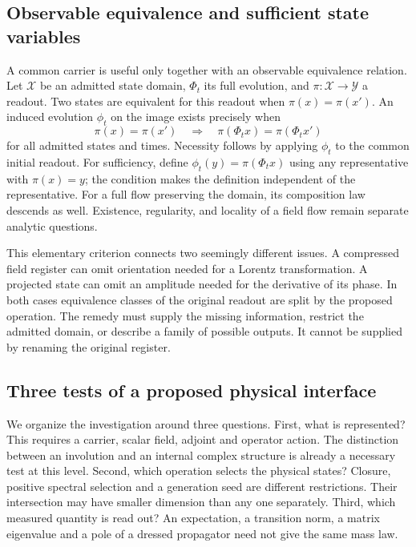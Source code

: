 \subsection{Observable equivalence and sufficient state variables}

A common carrier is useful only together with an observable equivalence
relation. Let $\mathcal X$ be an admitted state domain, $\Phi_t$ its
full evolution, and $\pi:\mathcal X\to\mathcal Y$ a readout.
Two states are equivalent for this readout when $\pi(x)=\pi(x')$.
An induced evolution $\phi_t$ on the image exists precisely when
\begin{equation}
 \pi(x)=\pi(x')\quad\Longrightarrow\quad
 \pi(\Phi_t x)=\pi(\Phi_t x')
\end{equation}
for all admitted states and times. Necessity follows by applying
$\phi_t$ to the common initial readout. For sufficiency, define
$\phi_t(y)=\pi(\Phi_t x)$ using any representative with $\pi(x)=y$;
the condition makes the definition independent of the representative.
For a full flow preserving the domain, its composition law descends
as well. Existence, regularity, and locality of a field flow remain
separate analytic questions.

This elementary criterion connects two seemingly different issues.
A compressed field register can omit orientation needed for a Lorentz
transformation. A projected state can omit an amplitude needed for
the derivative of its phase. In both cases equivalence classes of
the original readout are split by the proposed operation. The remedy
must supply the missing information, restrict the admitted domain,
or describe a family of possible outputs. It cannot be supplied by
renaming the original register.

\subsection{Three tests of a proposed physical interface}

We organize the investigation around three questions. First, what
is represented? This requires a carrier, scalar field, adjoint and
operator action. The distinction between an involution and an internal
complex structure is already a necessary test at this level. Second,
which operation selects the physical states? Closure, positive
spectral selection and a generation seed are different restrictions.
Their intersection may have smaller dimension than any one separately.
Third, which measured quantity is read out? An expectation, a transition
norm, a matrix eigenvalue and a pole of a dressed propagator need not
give the same mass law.

